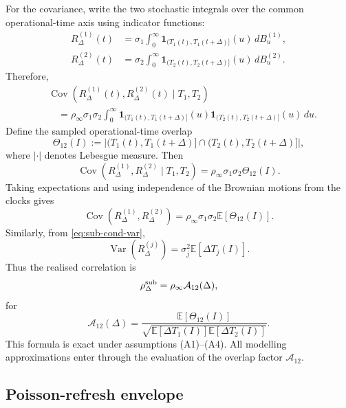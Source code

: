 \documentclass[5p,final]{elsarticle}
\begin{document}
For the covariance, write the two stochastic integrals over the common operational-time axis using indicator functions:
\begin{align}
R^{(1)}_\Delta(t)
&=\sigma_1\int_0^\infty
\mathbf 1_{(T_1(t),T_1(t+\Delta)]}(u)\,dB^{(1)}_u,\\
R^{(2)}_\Delta(t)
&=\sigma_2\int_0^\infty
\mathbf 1_{(T_2(t),T_2(t+\Delta)]}(u)\,dB^{(2)}_u.
\end{align}
Therefore,
\begin{align}
&\operatorname{Cov}\!\left(R^{(1)}_\Delta(t),R^{(2)}_\Delta(t)\mid T_1,T_2\right)\nonumber\\
&\quad=\rho_\infty\sigma_1\sigma_2
\int_0^\infty
\mathbf 1_{(T_1(t),T_1(t+\Delta)]}(u)
\mathbf 1_{(T_2(t),T_2(t+\Delta)]}(u)\,du.
\end{align}
Define the sampled operational-time overlap
\begin{equation}
\Theta_{12}(I)
:=\left|(T_1(t),T_1(t+\Delta)]\cap (T_2(t),T_2(t+\Delta)]\right|,
\end{equation}
where $|\cdot|$ denotes Lebesgue measure.  Then
\begin{equation}
\operatorname{Cov}\!\left(R^{(1)}_\Delta,R^{(2)}_\Delta\mid T_1,T_2\right)
=\rho_\infty\sigma_1\sigma_2\Theta_{12}(I).
\label{eq:sub-cond-cov}
\end{equation}
Taking expectations and using independence of the Brownian motions from the clocks gives
\begin{equation}
\operatorname{Cov}\!\left(R^{(1)}_\Delta,R^{(2)}_\Delta\right)
=\rho_\infty\sigma_1\sigma_2\mathbb E[\Theta_{12}(I)].
\end{equation}
Similarly, from \eqref{eq:sub-cond-var},
\begin{equation}
\operatorname{Var}\!\left(R^{(j)}_\Delta\right)
=\sigma_j^2\mathbb E[\Delta T_j(I)].
\end{equation}
Thus the realised correlation is
\begin{equation}
\rho^{\rm sub}_\Delta
=\rho_\infty\mathcal A_{12}(\Delta),
\end{equation}
for
\begin{equation}
\mathcal A_{12}(\Delta)
=\frac{\mathbb E[\Theta_{12}(I)]}
{\sqrt{\mathbb E[\Delta T_1(I)]\mathbb E[\Delta T_2(I)]}}.
\label{eq:sub-general-factor}
\end{equation}
This formula is exact under assumptions (A1)--(A4).  All modelling approximations enter through the evaluation of the overlap factor $\mathcal A_{12}$.

\subsection{Poisson-refresh envelope}
\end{document}
